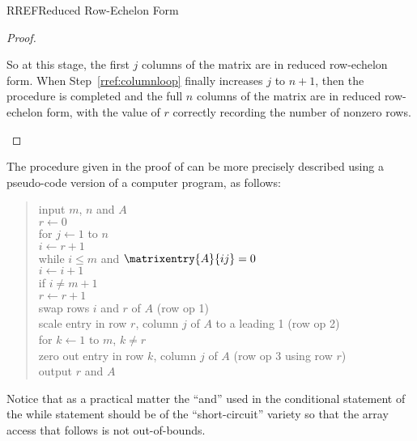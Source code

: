\begin{subsect}{RREF}{Reduced Row-Echelon Form}
\begin{proof}
%
\begin{para}So at this stage, the first $j$ columns of the matrix are in reduced row-echelon form.  When Step~\ref{rref:columnloop} finally increases $j$ to $n+1$, then the procedure is completed and the full $n$ columns of the matrix are in reduced row-echelon form, with the value of $r$ correctly recording the number of nonzero rows.\end{para}
%
\end{proof}
%
\begin{para}The procedure given in the proof of  can be more precisely described using a pseudo-code version of a computer program, as follows:
%
%
\begin{quote}
  input $m$, $n$ and $A$\\
  $r\leftarrow 0$\\
  for $j\leftarrow 1$ to $n$\\
     $i\leftarrow r+1$\\
     while $i\leq m$ and $\matrixentry{A}{ij}=0$\\
         $i \leftarrow i+1$\\
     if $i\neq m+1$\\
         $r\leftarrow r+1$\\
         swap rows $i$ and $r$ of $A$ (row op 1)\\
         scale entry in row $r$, column $j$ of $A$ to a leading 1 (row op 2)\\
         for $k\leftarrow 1\text{ to }m$, $k\neq r$\\
            zero out entry in row $k$, column $j$ of $A$ (row op 3 using row $r$)\\
  output $r$ and $A$
\end{quote}\end{para}
%
\begin{para}Notice that as a practical matter the ``and'' used in the conditional statement of the while statement should be of the ``short-circuit'' variety so that the array access that follows is not out-of-bounds.\end{para}
%

\end{subsect}
